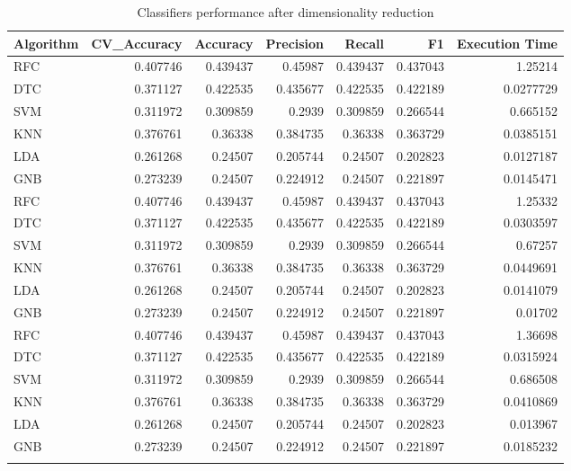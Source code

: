 \documentclass[conference,onecolumn]{IEEEtran}
\begin{document}
    \begin{longtable}{lrrrrrr}
        \hline
         Algorithm   &   CV\_Accuracy &   Accuracy &   Precision &   Recall &       F1 &   Execution Time \\
        \hline
         RFC         &      0.407746 &   0.439437 &    0.45987  & 0.439437 & 0.437043 &        1.25214   \\
         DTC         &      0.371127 &   0.422535 &    0.435677 & 0.422535 & 0.422189 &        0.0277729 \\
         SVM         &      0.311972 &   0.309859 &    0.2939   & 0.309859 & 0.266544 &        0.665152  \\
         KNN         &      0.376761 &   0.36338  &    0.384735 & 0.36338  & 0.363729 &        0.0385151 \\
         LDA         &      0.261268 &   0.24507  &    0.205744 & 0.24507  & 0.202823 &        0.0127187 \\
         GNB         &      0.273239 &   0.24507  &    0.224912 & 0.24507  & 0.221897 &        0.0145471 \\
         RFC         &      0.407746 &   0.439437 &    0.45987  & 0.439437 & 0.437043 &        1.25332   \\
         DTC         &      0.371127 &   0.422535 &    0.435677 & 0.422535 & 0.422189 &        0.0303597 \\
         SVM         &      0.311972 &   0.309859 &    0.2939   & 0.309859 & 0.266544 &        0.67257   \\
         KNN         &      0.376761 &   0.36338  &    0.384735 & 0.36338  & 0.363729 &        0.0449691 \\
         LDA         &      0.261268 &   0.24507  &    0.205744 & 0.24507  & 0.202823 &        0.0141079 \\
         GNB         &      0.273239 &   0.24507  &    0.224912 & 0.24507  & 0.221897 &        0.01702   \\
         RFC         &      0.407746 &   0.439437 &    0.45987  & 0.439437 & 0.437043 &        1.36698   \\
         DTC         &      0.371127 &   0.422535 &    0.435677 & 0.422535 & 0.422189 &        0.0315924 \\
         SVM         &      0.311972 &   0.309859 &    0.2939   & 0.309859 & 0.266544 &        0.686508  \\
         KNN         &      0.376761 &   0.36338  &    0.384735 & 0.36338  & 0.363729 &        0.0410869 \\
         LDA         &      0.261268 &   0.24507  &    0.205744 & 0.24507  & 0.202823 &        0.013967  \\
         GNB         &      0.273239 &   0.24507  &    0.224912 & 0.24507  & 0.221897 &        0.0185232 \\
        \hline
        \caption{Classifiers performance after dimensionality reduction}
        \label{appdx:classifierPerformanceAfterDimensionalityReduction}
    \end{longtable}
            
\end{document}
